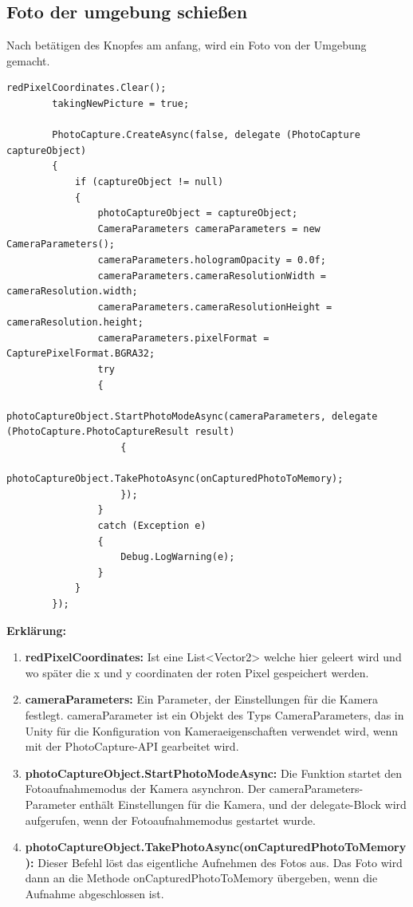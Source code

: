 \subsection*{Foto der umgebung schießen}
Nach betätigen des Knopfes am anfang, wird ein Foto von der Umgebung gemacht.
\begin{lstlisting}[style=csharp, caption={}, label=code:takingPicture]
        redPixelCoordinates.Clear();
        takingNewPicture = true;

        PhotoCapture.CreateAsync(false, delegate (PhotoCapture captureObject)
        {
            if (captureObject != null)
            {
                photoCaptureObject = captureObject;
                CameraParameters cameraParameters = new CameraParameters();
                cameraParameters.hologramOpacity = 0.0f;
                cameraParameters.cameraResolutionWidth = cameraResolution.width;
                cameraParameters.cameraResolutionHeight = cameraResolution.height;
                cameraParameters.pixelFormat = CapturePixelFormat.BGRA32;
                try
                {
                    photoCaptureObject.StartPhotoModeAsync(cameraParameters, delegate (PhotoCapture.PhotoCaptureResult result)
                    {
                        photoCaptureObject.TakePhotoAsync(onCapturedPhotoToMemory);
                    });
                }
                catch (Exception e)
                {
                    Debug.LogWarning(e);
                }
            }
        });
\end{lstlisting}
\textbf{Erklärung:}
\begin{enumerate}
    \item \textbf{redPixelCoordinates:} Ist eine List<Vector2> welche hier geleert wird und wo später die x und y coordinaten der roten Pixel gespeichert werden.
    \item \textbf{cameraParameters:} Ein Parameter, der Einstellungen für die Kamera festlegt. cameraParameter ist ein Objekt des Typs CameraParameters, das in Unity für die Konfiguration von Kameraeigenschaften verwendet wird, wenn mit der PhotoCapture-API gearbeitet wird.
    \item \textbf{photoCaptureObject.StartPhotoModeAsync:} Die Funktion startet den Fotoaufnahmemodus der Kamera asynchron. Der cameraParameters-Parameter enthält Einstellungen für die Kamera, und der delegate-Block wird aufgerufen, wenn der Fotoaufnahmemodus gestartet wurde.
    \item \textbf{photoCaptureObject.TakePhotoAsync(onCapturedPhotoToMemory):} Dieser Befehl löst das eigentliche Aufnehmen des Fotos aus. Das Foto wird dann an die Methode onCapturedPhotoToMemory übergeben, wenn die Aufnahme abgeschlossen ist.\\
\end{enumerate}


